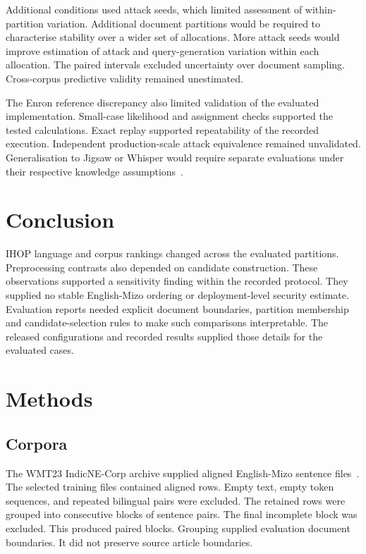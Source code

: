 \documentclass[12pt]{article}
\begin{document}
Additional conditions used \SensitivitySeeds{} attack seeds, which limited assessment of within-partition variation. Additional document partitions would be required to characterise stability over a wider set of allocations. More attack seeds would improve estimation of attack and query-generation variation within each allocation. The paired intervals excluded uncertainty over document sampling. Cross-corpus predictive validity remained unestimated.

The Enron reference discrepancy also limited validation of the evaluated implementation. Small-case likelihood and assignment checks supported the tested calculations. Exact replay supported repeatability of the recorded execution. Independent production-scale attack equivalence remained unvalidated. Generalisation to Jigsaw or Whisper would require separate evaluations under their respective knowledge assumptions~\cite{jigsaw,whisper}.

\section{Conclusion}
IHOP language and corpus rankings changed across the evaluated partitions. Preprocessing contrasts also depended on candidate construction. These observations supported a sensitivity finding within the recorded protocol. They supplied no stable English-Mizo ordering or deployment-level security estimate. Evaluation reports needed explicit document boundaries, partition membership and candidate-selection rules to make such comparisons interpretable. The released configurations and recorded results supplied those details for the evaluated cases.

\section{Methods}
\subsection{Corpora}
The WMT23 IndicNE-Corp archive supplied aligned English-Mizo sentence files~\cite{indic}. The selected training files contained \SourceRows{} aligned rows. Empty text, empty token sequences, and repeated bilingual pairs were excluded. The retained rows were grouped into consecutive blocks of \SentencesPerBlock{} sentence pairs. The final incomplete block was excluded. This produced \ProductionPairs{} paired blocks. Grouping supplied evaluation document boundaries. It did not preserve source article boundaries.
\end{document}
